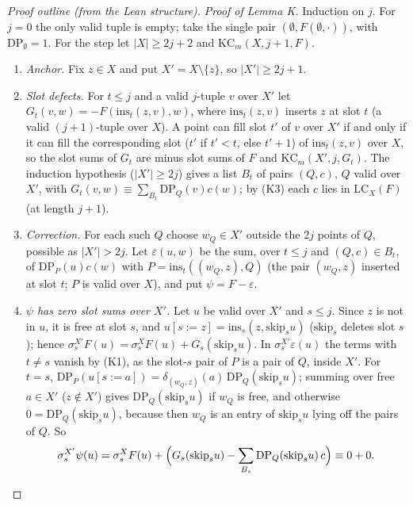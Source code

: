 \begin{proof}[Proof outline (from the Lean structure)]
\smallskip\noindent\emph{Proof of Lemma K.}  Induction on $j$.  For $j=0$ the only valid tuple
is empty; take the single pair $(\emptyset,F(\emptyset,\cdot))$, with
$\mathrm{DP}_\emptyset=1$.
For the step let $|X|\ge2j+2$ and $\mathrm{KC}_m(X,j+1,F)$.
\begin{enumerate}
\item \emph{Anchor.}  Fix $z\in X$ and put $X'=X\setminus\{z\}$, so $|X'|\ge2j+1$.
\item \emph{Slot defects.}  For $t\le j$ and a valid $j$-tuple $v$ over $X'$ let
$G_t(v,w)=-F(\mathrm{ins}_t(z,v),w)$, where $\mathrm{ins}_t(z,v)$ inserts $z$ at slot $t$
(a valid $(j+1)$-tuple over $X$).  A point can fill slot $t'$ of $v$ over $X'$ if and only if
it can fill the corresponding slot ($t'$ if $t'<t$, else $t'+1$) of $\mathrm{ins}_t(z,v)$
over $X$, so the slot sums of $G_t$ are minus slot sums of $F$ and
$\mathrm{KC}_m(X',j,G_t)$.  The induction
hypothesis ($|X'|\ge2j$) gives a list $B_t$ of pairs $(Q,c)$, $Q$ valid over $X'$, with
$G_t(v,w)\equiv\sum_{B_t}\mathrm{DP}_Q(v)c(w)$; by (K3) each $c$ lies in
$\mathrm{LC}_X(F)$ (at length $j+1$).
\item \emph{Correction.}  For each such $Q$ choose $w_Q\in X'$ outside the $2j$ points of
$Q$, possible as $|X'|>2j$.  Let $\varepsilon(u,w)$ be the sum, over
$t\le j$ and $(Q,c)\in B_t$, of $\mathrm{DP}_{P}(u)c(w)$ with $P=\mathrm{ins}_t((w_Q,z),Q)$
(the pair $(w_Q,z)$ inserted at slot $t$; $P$ is valid over $X$), and put
$\psi=F-\varepsilon$.
\item \emph{$\psi$ has zero slot sums over $X'$.}  Let $u$ be valid over $X'$ and $s\le j$.
Since $z$ is not in $u$, it is free at slot $s$, and $u[s:=z]=\mathrm{ins}_s(z,\mathrm{skip}_su)$
($\mathrm{skip}_s$ deletes slot $s$); hence
$\sigma^{X'}_sF(u)=\sigma^X_sF(u)+G_s(\mathrm{skip}_su)$.  In $\sigma^{X'}_s\varepsilon(u)$ the
terms with $t\ne s$ vanish by (K1), as the slot-$s$ pair of $P$ is a pair of $Q$, inside $X'$.
For $t=s$, $\mathrm{DP}_P(u[s:=a])=\delta_{(w_Q,z)}(a)\,\mathrm{DP}_Q(\mathrm{skip}_su)$; summing
over free $a\in X'$ ($z\notin X'$) gives $\mathrm{DP}_Q(\mathrm{skip}_su)$ if $w_Q$ is free, and
otherwise $0=\mathrm{DP}_Q(\mathrm{skip}_su)$, because then $w_Q$ is an entry of
$\mathrm{skip}_su$ lying off the pairs of $Q$.  So
\[
\sigma^{X'}_s\psi(u)=\sigma^X_sF(u)+\Bigl(G_s(\mathrm{skip}_su)-\sum_{B_s}\mathrm{DP}_Q(\mathrm{skip}_su)\,c\Bigr)\equiv0+0 .
\]
\end{enumerate}
\end{proof}

